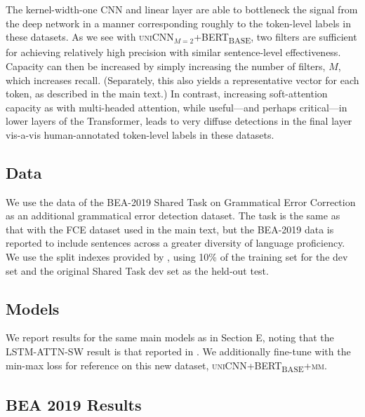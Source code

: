 \documentclass{clv3}
\begin{document}
The kernel-width-one CNN and linear layer are able to bottleneck the signal from the deep network in a manner corresponding roughly to the token-level labels in these datasets. As we see with \textsc{uniCNN$_{M=2}$+BERT\textsubscript{BASE}}, two filters are sufficient for achieving relatively high precision with similar sentence-level effectiveness. Capacity can then be increased by simply increasing the number of filters, $M$, which increases recall. (Separately, this also yields a representative vector for each token, as described in the main text.) In contrast, increasing soft-attention capacity as with multi-headed attention, while useful---and perhaps critical---in lower layers of the Transformer, leads to very diffuse detections in the final layer vis-a-vis human-annotated token-level labels in these datasets. 

\subsection{Data}
 
We use the data of the BEA-2019 Shared Task on Grammatical Error Correction \cite{BryantEtAl-2019-BEASharedTask} as an additional grammatical error detection dataset. The task is the same as that with the FCE dataset used in the main text, but the BEA-2019 data is reported to include sentences across a greater diversity of language proficiency. We use the split indexes provided by \citet{BujelEtAl-2021-Zeroshot-Weighted-Attention}, using 10\% of the training set for the dev set and the original Shared Task dev set as the held-out test. 

\subsection{Models} We report results for the same main models as in Section E, noting that the \textsc{LSTM-ATTN-SW} result is that reported in \citet{BujelEtAl-2021-Zeroshot-Weighted-Attention}. We additionally fine-tune with the min-max loss for reference on this new dataset, \textsc{uniCNN+BERT\textsubscript{BASE}+mm}.

\subsection{BEA 2019 Results}
\end{document}
